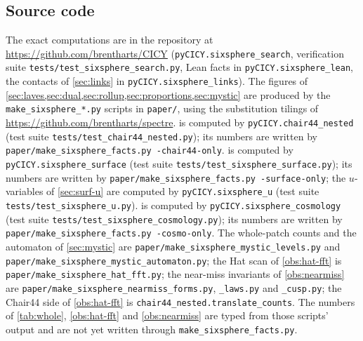 \documentclass[11pt,a4paper]{article}
\theoremstyle{plain}
\theoremstyle{definition}
\begin{document}
\subsection*{Source code}
\label{sec:source}

\begin{sloppypar}
The exact computations are in the repository at
\url{https://github.com/brentharts/CICY} (\texttt{pyCICY.sixsphere\_search},
verification suite \texttt{tests/test\_sixsphere\_search.py}, Lean facts in
\texttt{pyCICY.sixsphere\_lean}, the contacts of \cref{sec:links} in
\texttt{pyCICY.sixsphere\_links}). The figures of
\cref{sec:laves,sec:dual,sec:rollup,sec:proportions,sec:mystic} are produced by the
\texttt{make\_sixsphere\_*.py} scripts in \texttt{paper/}, using the substitution
tilings of \url{https://github.com/brentharts/spectre}.  is computed
by \texttt{pyCICY.chair44\_nested} (test suite \texttt{tests/test\_chair44\_nested.py});
its numbers are written by \texttt{paper/make\_sixsphere\_facts.py \-\--chair44-only}.
 is computed by \texttt{pyCICY.sixsphere\_surface} (test suite \texttt{tests/test\_sixsphere\_surface.py});
its numbers are written by \texttt{paper/make\_sixsphere\_facts.py \-\--surface-only}; the $u$-variables of \cref{sec:surf-u} are computed by \texttt{pyCICY.sixsphere\_u} (test suite \texttt{tests/test\_sixsphere\_u.py}).
 is computed by \texttt{pyCICY.sixsphere\_cosmology} (test suite
\texttt{tests/test\_sixsphere\_cosmology.py}); its numbers are written by
\texttt{paper/make\_sixsphere\_facts.py \-\--cosmo-only}.
The whole-patch counts and the automaton of \cref{sec:mystic} are
\texttt{paper/make\_sixsphere\_mystic\_levels.py} and
\texttt{paper/make\_sixsphere\_mystic\_automaton.py}; the Hat scan of
\cref{obs:hat-fft} is \texttt{paper/make\_sixsphere\_hat\_fft.py}; the near-miss
invariants of \cref{obs:nearmiss} are
\texttt{paper/make\_sixsphere\_nearmiss\_forms.py}, \texttt{\_laws.py} and
\texttt{\_cusp.py}; the Chair44 side of \cref{obs:hat-fft} is
\texttt{chair44\_nested.translate\_counts}. The numbers of \cref{tab:whole}, \cref{obs:hat-fft} and
\cref{obs:nearmiss} are typed from those scripts' output and are not yet written
through \texttt{make\_sixsphere\_facts.py}.
\end{sloppypar}
\end{document}

